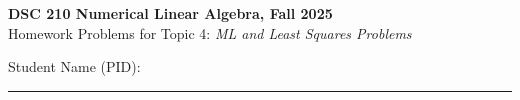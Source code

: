 \documentclass[11pt,letterpaper]{article}
\begin{document}
\pagestyle{plain}


 
\begin{center}
\textbf{\Large DSC 210 Numerical Linear Algebra, Fall 2025} \\ \bigskip
\large{Homework Problems for Topic 4: \textit{ML and Least Squares Problems}} \\  \bigskip
\begin{flushleft}
    \large{Student Name (PID):}
\end{flushleft}
\end{center}
\vspace{-4mm}
\rule{\linewidth}{0.1mm}

\bigskip
\end{document}
